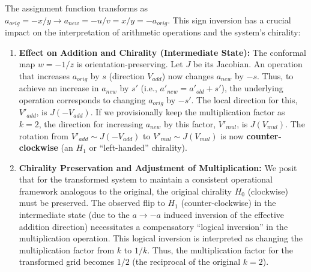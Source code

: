 The assignment function transforms as $a_{orig} = -x/y \to a_{new} = -u/v = x/y = -a_{orig}$. This sign inversion has a crucial impact on the interpretation of arithmetic operations and the system's chirality:

\begin{enumerate}
    \item \textbf{Effect on Addition and Chirality (Intermediate State):}
    The conformal map $w=-1/z$ is orientation-preserving. Let $J$ be its Jacobian.
    An operation that increases $a_{orig}$ by $s$ (direction $V_{add}$) now changes $a_{new}$ by $-s$. Thus, to achieve an increase in $a_{new}$ by $s'$ (i.e., $a'_{new} = a'_{old} + s'$), the underlying operation corresponds to changing $a_{orig}$ by $-s'$. The local direction for this, $V'_{add}$, is $J(-V_{add})$.
    If we provisionally keep the multiplication factor as $k=2$, the direction for increasing $a_{new}$ by this factor, $V'_{mul}$, is $J(V_{mul})$.
    The rotation from $V'_{add} \sim J(-V_{add})$ to $V'_{mul} \sim J(V_{mul})$ is now \textbf{counter-clockwise} (an $H_1$ or ``left-handed'' chirality).

    \item \textbf{Chirality Preservation and Adjustment of Multiplication:}
    We posit that for the transformed system to maintain a consistent operational framework analogous to the original, the original chirality $H_0$ (clockwise) must be preserved. The observed flip to $H_1$ (counter-clockwise) in the intermediate state (due to the $a \to -a$ induced inversion of the effective addition direction) necessitates a compensatory ``logical inversion'' in the multiplication operation. This logical inversion is interpreted as changing the multiplication factor from $k$ to $1/k$.
    Thus, the multiplication factor for the transformed grid becomes $1/2$ (the reciprocal of the original $k=2$).


\end{enumerate}
